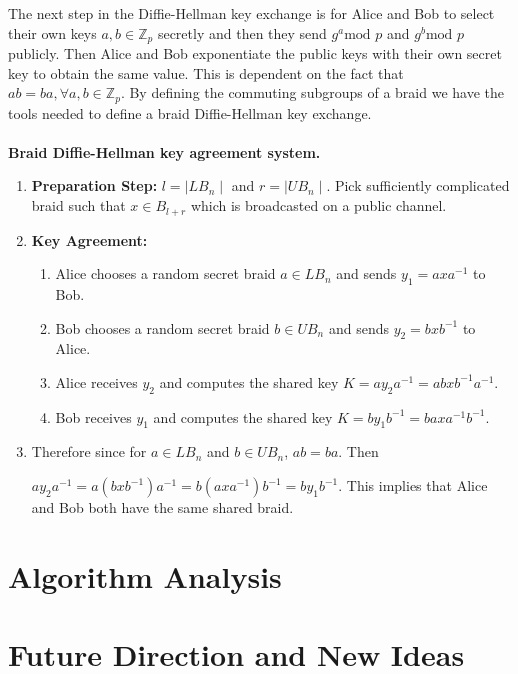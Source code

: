 \documentclass{article}
\theoremstyle{definition}
\begin{document}
The next step in the Diffie-Hellman key exchange is for Alice and Bob to select their own keys $a,b \in \mathbb{Z}_p$  secretly and then they send $g^a \text{mod }p$ and $g^b \text{mod }p$ publicly. Then Alice and Bob exponentiate the public keys with their own secret key to obtain the same value. This is dependent on the fact that $ab=ba,  \forall a,b \in \mathbb{Z}_p$. By defining the commuting subgroups of a braid we have the tools needed to define a braid Diffie-Hellman key exchange. 
\\ \\
\textbf{Braid Diffie-Hellman key agreement system.}
\begin{enumerate}

\item \textbf{Preparation Step:} $l=\mid LB_n \mid$ and $r=\mid UB_n \mid$. Pick sufficiently complicated braid such that $x \in B_{l+r}$ which is broadcasted on a public channel. 

\item \textbf{Key Agreement:} 
	 \begin{enumerate}
	 	\item Alice chooses a random secret braid $a \in LB_n$ and sends $y_1=axa^{-1}$ to Bob.
		\item Bob chooses a random secret braid $b \in UB_n$ and sends $y_2=bxb^{-1}$ to Alice.
		\item Alice receives $y_2$ and computes the shared key $K=ay_2a^{-1}=abxb^{-1}a^{-1}$.
		\item Bob receives $y_1$ and computes the shared key $K=by_1b^{-1}=baxa^{-1}b^{-1}$.
	 \end{enumerate}
\item Therefore since for $a \in LB_n$ and $b \in UB_n$, $ab=ba$. Then
\begin{centering}
$ay_2a^{-1}=a(bxb^{-1})a^{-1}=b(axa^{-1})b^{-1}=by_1b^{-1}$. This implies that Alice and Bob both have the same shared braid.
\end{centering}
\end{enumerate}

\section{Algorithm Analysis}


\section{Future Direction and New Ideas}
\end{document}
